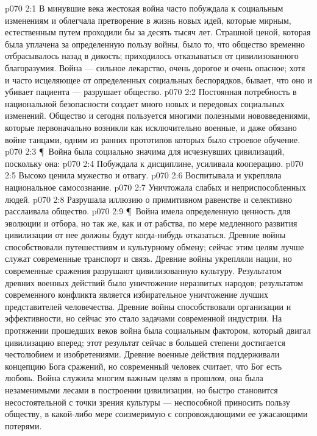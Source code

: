 \vs p070 2:1 В минувшие века жестокая война часто побуждала к социальным изменениям и облегчала претворение в жизнь новых идей, которые мирным, естественным путем проходили бы за десять тысяч лет. Страшной ценой, которая была уплачена за определенную пользу войны, было то, что общество временно отбрасывалось назад в дикость; приходилось отказываться от цивилизованного благоразумия. Война --- сильное лекарство, очень дорогое и очень опасное; хотя и часто исцеляющее от определенных социальных беспорядков, бывает, что оно и убивает пациента --- разрушает общество.
\vs p070 2:2 Постоянная потребность в национальной безопасности создает много новых и передовых социальных изменений. Общество и сегодня пользуется многими полезными нововведениями, которые первоначально возникли как исключительно военные, и даже обязано войне танцами, одним из ранних прототипов которых было строевое обучение.
\vs p070 2:3 \P\ Война была социально значима для исчезнувших цивилизаций, поскольку она:
\vs p070 2:4 \bibnobreakspace Побуждала к дисциплине, усиливала кооперацию.
\vs p070 2:5 \bibnobreakspace Высоко ценила мужество и отвагу.
\vs p070 2:6 \bibnobreakspace Воспитывала и укрепляла национальное самосознание.
\vs p070 2:7 \bibnobreakspace Уничтожала слабых и неприспособленных людей.
\vs p070 2:8 \bibnobreakspace Разрушала иллюзию о примитивном равенстве и селективно расслаивала общество.
\vs p070 2:9 \P\ Война имела определенную ценность для эволюции и отбора, но так же, как и от рабства, по мере медленного развития цивилизации от нее должны будут когда\hyp{}нибудь отказаться. Древние войны способствовали путешествиям и культурному обмену; сейчас этим целям лучше служат современные транспорт и связь. Древние войны укрепляли нации, но современные сражения разрушают цивилизованную культуру. Результатом древних военных действий было уничтожение неразвитых народов; результатом современного конфликта является избирательное уничтожение лучших представителей человечества. Древние войны способствовали организации и эффективности, но сейчас это стало задачами современной индустрии. На протяжении прошедших веков война была социальным фактором, который двигал цивилизацию вперед; этот результат сейчас в большей степени достигается честолюбием и изобретениями. Древние военные действия поддерживали концепцию Бога сражений, но современный человек считает, что Бог есть любовь. Война служила многим важным целям в прошлом, она была незаменимыми лесами в построении цивилизации, но быстро становится несостоятельной с точки зрения культуры --- неспособной приносить пользу обществу, в какой\hyp{}либо мере соизмеримую с сопровождающими ее ужасающими потерями.
